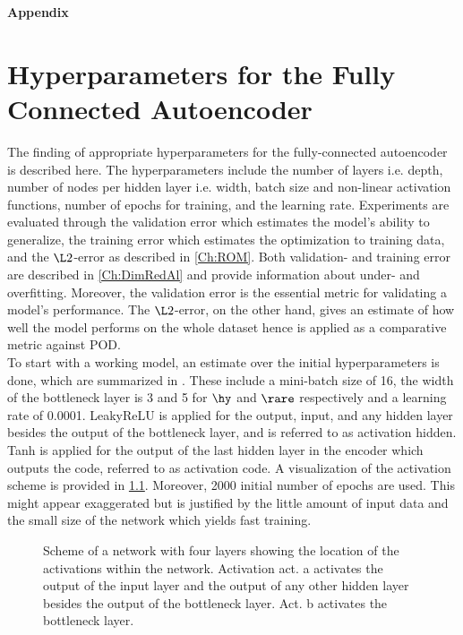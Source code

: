 

\begin{center}
	{\sffamily \bfseries\Large Appendix}\\
\end{center}%
\vspace{1cm}
\chapter{Hyperparameters for the Fully Connected Autoencoder}
\label{Ch:ApA}

The finding of appropriate hyperparameters for the fully-connected autoencoder is described here. The hyperparameters include the number of layers i.e. depth, number of nodes per hidden layer i.e. width, batch size and non-linear activation functions, number of epochs for training, and the learning rate. Experiments are evaluated through the validation error which estimates the model's ability to generalize, the training error which estimates the optimization to training data, and the $\L2$-error as described in \cref{Ch:ROM}. Both validation- and training error are described in \cref{Ch:DimRedAl} and provide information about under- and overfitting. Moreover, the validation error is the essential metric for validating a model's performance. The $\L2$-error, on the other hand, gives an estimate of how well the model performs on the whole dataset hence is applied as a comparative metric against POD.\\ 
To start with a working model, an estimate over the initial hyperparameters is done, which are summarized in . These include a mini-batch size of 16, the width of the bottleneck layer is 3 and 5  for \(\hy\) and \(\rare\) respectively and a learning rate of 0.0001. LeakyReLU is applied for the output, input, and any hidden layer besides the output of the bottleneck layer, and is referred to as activation hidden. Tanh is applied for the output of the last hidden layer in the encoder which outputs the code, referred to as activation code. A visualization of the activation scheme is provided in \cref{Fig:ActScheme}. Moreover, 2000 initial number of epochs are used. This might appear exaggerated but is justified by the little amount of input data and the small size of the network which yields fast training.
\begin{center}
	\begin{figure}[H]
		\centering
		
		\caption{Scheme of a network with four layers showing the location of the activations within the network. Activation act. a activates the output of the input layer and the output of any other hidden layer besides the output of the bottleneck layer. Act. b activates the bottleneck layer.}
		\label{Fig:ActScheme}
		\end{figure}
\end{center}
